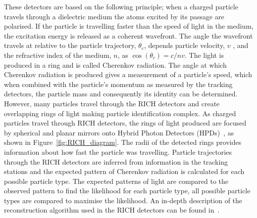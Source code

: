 These detectors are based on the following principle; when a charged particle travels through a dielectric medium the atoms excited by its passage are polarised. If the particle is travelling faster than the speed of light in the medium, the excitation energy is released as a coherent wavefront. The angle the wavefront travels at relative to the particle trajectory, $\theta_{c}$, depends particle velocity, $v$ , and the refractive index of the medium, $n$, as $\cos(\theta_{c}) = c/nv$. The light is produced in a ring and is called Cherenkov radiation. %
The angle at which Cherenkov radiation is produced gives a measurement of a particle’s speed, which when combined with the particle’s momentum as measured by the tracking detectors, the particle mass and consequently its identity can be determined. However, many particles travel through the RICH detectors and create overlapping rings of light making particle identification complex. As charged particles travel through RICH detectors, the rings of light produced are focused by spherical and planar mirrors onto Hybrid Photon Detectors (HPDs)~\cite{Alemi:1999np}, as shown in Figure~\ref{fig:RICH_diagram}. The radii of the detected rings provides information about how fast the particle was travelling.
Particle trajectories through the RICH detectors are inferred from information in the tracking stations and the expected pattern of Cherenkov radiation is calculated for each possible particle type. The expected patterns of light are compared to the observed pattern to find the likelihood for each particle type, all possible particle types are compared to maximise the likelihood. An in-depth description of the reconstruction algorithm used in the RICH detectors can be found in~\cite{Forty:684714}. 

